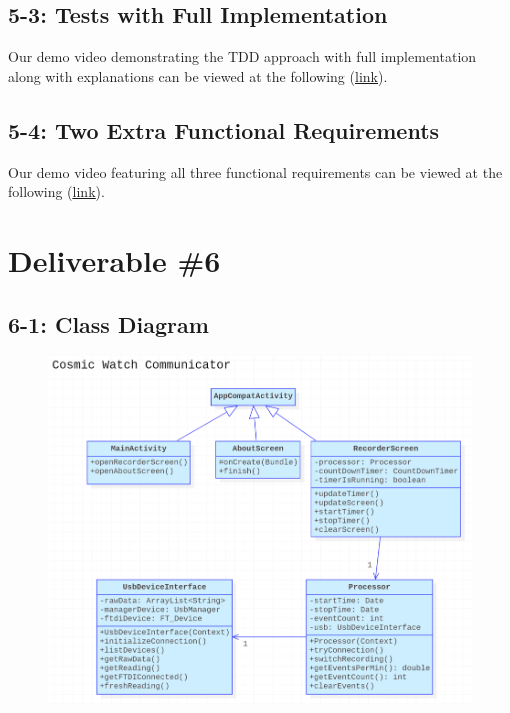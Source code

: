 \documentclass[11pt,a4paper]{article}
\begin{document}
\subsection*{5-3: Tests with Full Implementation}

Our demo video demonstrating the TDD approach with full implementation along with explanations can be viewed at the following (\href{https://www.youtube.com/watch?v=h2C-4-hQrhM&feature=youtu.be}{\underline{link}}).

\subsection*{5-4: Two Extra Functional Requirements}

Our demo video featuring all three functional requirements can be viewed at the following (\href{https://www.dropbox.com/s/vnuvuzx5zrtkvaa/Demo.mp4?dl=0}{\underline{link}}).



\newpage


\section*{Deliverable \#6}

\subsection*{6-1: Class Diagram}

\begin{figure}[h] \centering \hspace*{-3cm} \vspace{3cm}
	\includegraphics[width=1.5\textwidth]{classes.png}
\end{figure}
\newpage
\end{document}
